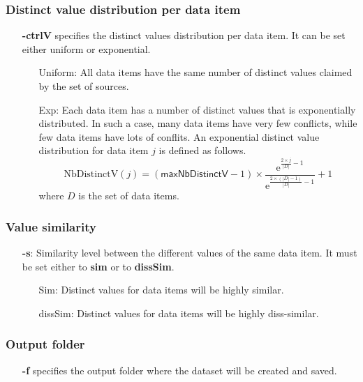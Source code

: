 \documentclass[a4paper,10pt]{scrartcl}
\newcommand{\expo}[1]{\ensuremath{\mathrm{e}^{#1}}}
\newcommand{\nbDistinctValue}[1]{\ensuremath{\mathrm{NbDistinctV}(#1)}}
\newcommand{\maxNbDistinctV}{\ensuremath{\mathsf{maxNbDistinctV}}}
\begin{document}
\subsubsection{Distinct value distribution per data item}
\begin{itemize}
 \item[\textbf{-ctrlV}] specifies the distinct values distribution per data item. It can be set either uniform  or exponential.
 \begin{itemize}
  \item [Uniform:] All data items have the same number of distinct values claimed by the set of sources.
  \item [Exp:]  Each data item has a number of distinct values that is exponentially distributed. In such a case, many data 
  items have very few conflicts, while few data items have lots of conflits. An exponential distinct value distribution for 
  data item $j$ is defined as follows.
  \[
   \nbDistinctValue{j} = (\maxNbDistinctV - 1)\times \frac{\expo{\frac{2\times j}{|D|}-1}}{\expo{\frac{2\times(|D|-1)}{|D|} -1}} + 1
  \]
where $D$ is the set of data items.
 \end{itemize}
\end{itemize}
\subsubsection{Value similarity}
\begin{itemize}
  \item[\textbf{-s}:] Similarity level between the different values of the same data item. It must be set either to \textbf{sim} or 
 to \textbf{dissSim}.
  \begin{itemize}
   \item [Sim:] Distinct values for data items will be highly similar.
   \item [dissSim:] Distinct values for data items will be highly diss-similar.
  \end{itemize}
\end{itemize}
\subsubsection{Output folder}
\begin{itemize}
 \item[\textbf{-f}] specifies the output folder where the dataset will be created and saved.
\end{itemize}
\end{document}
